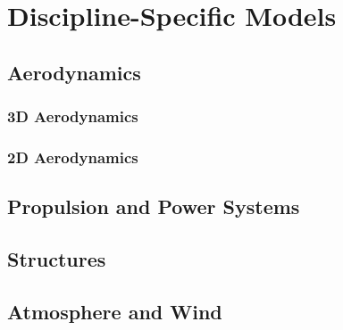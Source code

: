 \chapter{Discipline-Specific Models}
\label{chapter:discipline}

\section{Aerodynamics}

\subsection{3D Aerodynamics}

\subsection{2D Aerodynamics}

\section{Propulsion and Power Systems}

\section{Structures}

\section{Atmosphere and Wind}